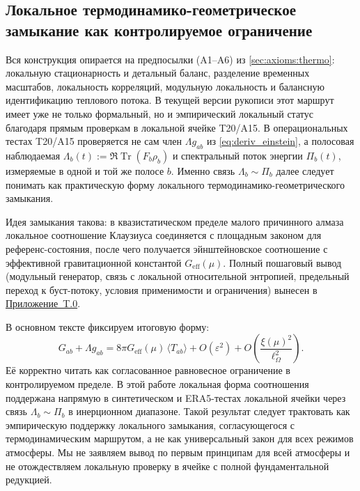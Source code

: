 \documentclass[11pt,a4paper]{article}
\DeclareMathOperator{\Tr}{Tr}
\theoremstyle{definition}
\theoremstyle{plain}
\theoremstyle{remark}
\begin{document}
\subsection{Локальное термодинамико-геометрическое замыкание как контролируемое ограничение}
\label{sec:derivations:gr}

Вся конструкция опирается на предпосылки (A1--A6) из \cref{sec:axioms:thermo}: локальную стационарность и детальный баланс, разделение временных масштабов, локальность корреляций, модульную локальность и балансную идентификацию теплового потока. В текущей версии рукописи этот маршрут имеет уже не только формальный, но и эмпирический локальный статус благодаря прямым проверкам в локальной ячейке T20/A15. В операциональных тестах T20/A15 проверяется не сам член $\Lambda g_{ab}$ из \cref{eq:deriv_einstein}, а полосовая наблюдаемая
\(\Lambda_b(t):=\Re\Tr(F_b\rho_b)\) и спектральный поток энергии \(\Pi_b(t)\), измеряемые в одной и той же полосе \(b\).
Именно связь \(\Lambda_b\sim\Pi_b\) далее следует понимать как практическую форму локального термодинамико-геометрического замыкания.

Идея замыкания такова: в квазистатическом пределе малого причинного алмаза локальное соотношение Клаузиуса соединяется с площадным законом для референс-состояния, после чего получается эйнштейновское соотношение с эффективной гравитационной константой $G_{\mathrm{eff}}(\mu)$. Полный пошаговый вывод (модульный генератор, связь с локальной относительной энтропией, предельный переход к буст-потоку, условия применимости и ограничения) вынесен в \hyperref[sec:appendix:einstein_full]{Приложение~T.0}.

В основном тексте фиксируем итоговую форму:
\begin{equation}\label{eq:deriv_einstein}
G_{ab}+\Lambda g_{ab}
=
8\pi G_{\mathrm{eff}}(\mu)\,\langle T_{ab}\rangle
+
O(\varepsilon^2)
+
O\!\left(\frac{\xi(\mu)^2}{\ell_\Omega^2}\right).
\end{equation}
Её корректно читать как согласованное равновесное ограничение в контролируемом пределе. В этой работе локальная форма соотношения поддержана напрямую в синтетическом и ERA5-тестах локальной ячейки через связь $\Lambda_b\sim\Pi_b$ в инерционном диапазоне. Такой результат следует трактовать как эмпирическую поддержку локального замыкания, согласующегося с термодинамическим маршрутом, а не как универсальный закон для всех режимов атмосферы. Мы не заявляем вывод по первым принципам для всей атмосферы и не отождествляем локальную проверку в ячейке с полной фундаментальной редукцией.
\end{document}
